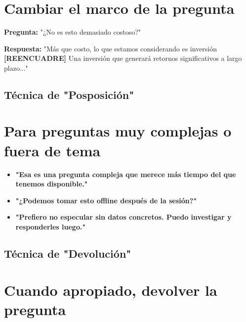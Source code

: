 \documentclass[a4paper,11pt]{article}
\begin{document}
\vspace{0.2cm}

\section{Cambiar el marco de la pregunta}

\textbf{Pregunta:} "¿No es esto demasiado costoso?"

\vspace{0.2cm}

\textbf{Respuesta:} "Más que costo, lo que estamos considerando es inversión \textbf{[REENCUADRE]} Una inversión que generará retornos significativos a largo plazo..."

\vspace{0.2cm}

\subsection{Técnica de "Posposición"}

\vspace{0.2cm}

\section{Para preguntas muy complejas o fuera de tema}

\begin{itemize}

  \item \textbf{"Esa es una pregunta compleja que merece más tiempo del que tenemos disponible."}

  \item \textbf{"¿Podemos tomar esto offline después de la sesión?"}

  \item \textbf{"Prefiero no especular sin datos concretos. Puedo investigar y responderles luego."}

\end{itemize}

\vspace{0.2cm}

\subsection{Técnica de "Devolución"}

\vspace{0.2cm}

\section{Cuando apropiado, devolver la pregunta}
\end{document}
